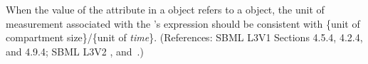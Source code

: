 When the value of the attribute  in a \RateRule object
refers to a \Compartment object, the unit of measurement associated with
the \RateRule's  expression should be consistent with \{unit of
compartment size\}/\{unit of \emph{time}\}.  (References: SBML L3V1 Sections 4.5.4, 4.2.4, and 4.9.4; SBML L3V2
, 
and~.)

